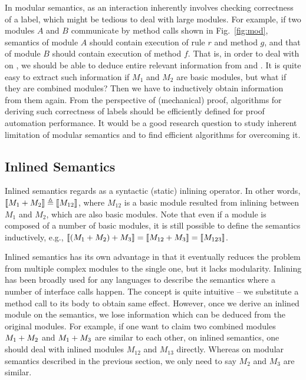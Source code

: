 In modular semantics, \Sem{\ModP{}} as an interaction inherently
involves checking correctness of a label, which might be tedious to
deal with large modules. For example, if two modules $A$ and $B$
communicate by method calls shown in Fig.~\ref{fig:mod}, semantics of
module $A$ should contain execution of rule $r$ and method $g$, and
that of module $B$ should contain execution of method $f$. That is, in
order to deal with \Sem{\ModP{}} on , we should
be able to deduce entire relevant information from  and
. It is quite easy to extract such information if $M_1$ and
$M_2$ are basic modules, but what if they are combined modules? Then
we have to inductively obtain information from them again. From the
perspective of (mechanical) proof, algorithms for deriving such
correctness of labels should be efficiently defined for proof
automation performance. It would be a good research question to study
inherent limitation of modular semantics and to find efficient
algorithms for overcoming it.

\subsection{Inlined Semantics}

Inlined semantics regards \ModP{} as a syntactic (static) inlining
operator. In other words, $\llbracket M_1 +{} M_2 \rrbracket \triangleq
\llbracket M_{12} \rrbracket$, where $M_{12}$ is a basic module resulted from inlining
between $M_1$ and $M_2$, which are also basic modules. Note that even
if a module is composed of a number of basic modules, it is still
possible to define the semantics inductively, e.g., $\llbracket (M_1 +{}
  M_2) +{} M_3 \rrbracket = \llbracket M_{12} +{} M_3 \rrbracket = \llbracket M_{123} \rrbracket$.

Inlined semantics has its own advantage in that it eventually reduces
the problem from multiple complex modules to the single one, but it
lacks modularity. Inlining has been broadly used for any languages to
describe the semantics where a number of interface calls happen. The
concept is quite intuitive -- we substitute a method call to its body
to obtain same effect. However, once we derive an inlined module on
the semantics, we lose information which can be deduced from the
original modules. For example, if one want to claim two combined
modules $M_1 +{} M_2$ and $M_1 +{} M_3$ are similar to each
other, on inlined semantics, one should deal with inlined modules
$M_{12}$ and $M_{13}$ directly. Whereas on modular semantics described
in the previous section, we only need to say $M_2$ and $M_3$ are
similar.

